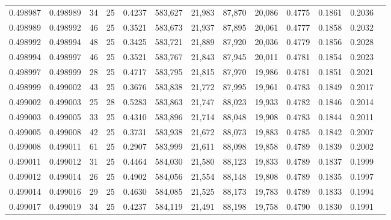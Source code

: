\begin{tabular}{rrrrrrrrrrrrr}
0.498987 & 0.498989 &    34 &  25 &                                     0.4237 & 583,627 &  21,983 &  87,870 &  20,086 & 0.4775 & 0.1861 & 0.2036 \\
0.498989 & 0.498992 &    46 &  25 &                                     0.3521 & 583,673 &  21,937 &  87,895 &  20,061 & 0.4777 & 0.1858 & 0.2032 \\
0.498992 & 0.498994 &    48 &  25 &                                     0.3425 & 583,721 &  21,889 &  87,920 &  20,036 & 0.4779 & 0.1856 & 0.2028 \\
0.498994 & 0.498997 &    46 &  25 &                                     0.3521 & 583,767 &  21,843 &  87,945 &  20,011 & 0.4781 & 0.1854 & 0.2023 \\
0.498997 & 0.498999 &    28 &  25 &                                     0.4717 & 583,795 &  21,815 &  87,970 &  19,986 & 0.4781 & 0.1851 & 0.2021 \\
0.498999 & 0.499002 &    43 &  25 &                                     0.3676 & 583,838 &  21,772 &  87,995 &  19,961 & 0.4783 & 0.1849 & 0.2017 \\
0.499002 & 0.499003 &    25 &  28 &                                     0.5283 & 583,863 &  21,747 &  88,023 &  19,933 & 0.4782 & 0.1846 & 0.2014 \\
0.499003 & 0.499005 &    33 &  25 &                                     0.4310 & 583,896 &  21,714 &  88,048 &  19,908 & 0.4783 & 0.1844 & 0.2011 \\
0.499005 & 0.499008 &    42 &  25 &                                     0.3731 & 583,938 &  21,672 &  88,073 &  19,883 & 0.4785 & 0.1842 & 0.2007 \\
0.499008 & 0.499011 &    61 &  25 &                                     0.2907 & 583,999 &  21,611 &  88,098 &  19,858 & 0.4789 & 0.1839 & 0.2002 \\
0.499011 & 0.499012 &    31 &  25 &                                     0.4464 & 584,030 &  21,580 &  88,123 &  19,833 & 0.4789 & 0.1837 & 0.1999 \\
0.499012 & 0.499014 &    26 &  25 &                                     0.4902 & 584,056 &  21,554 &  88,148 &  19,808 & 0.4789 & 0.1835 & 0.1997 \\
0.499014 & 0.499016 &    29 &  25 &                                     0.4630 & 584,085 &  21,525 &  88,173 &  19,783 & 0.4789 & 0.1833 & 0.1994 \\
0.499017 & 0.499019 &    34 &  25 &                                     0.4237 & 584,119 &  21,491 &  88,198 &  19,758 & 0.4790 & 0.1830 & 0.1991 \\

\end{tabular}

